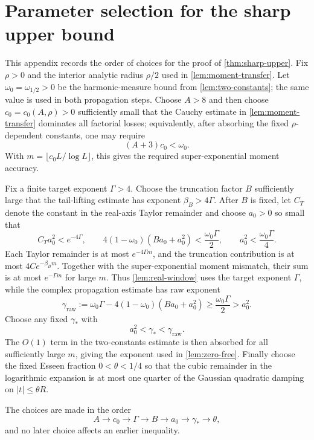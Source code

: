 \section{Parameter selection for the sharp upper bound}\label{app:parameters}

This appendix records the order of choices for the proof of \cref{thm:sharp-upper}. Fix $\rho>0$ and the interior analytic radius $\rho/2$ used in \cref{lem:moment-transfer}. Let $\omega_0=\omega_{1/2}>0$ be the harmonic-measure bound from \cref{lem:two-constants}; the same value is used in both propagation steps. Choose $A>8$ and then choose $c_0=c_0(A,\rho)>0$ sufficiently small that the Cauchy estimate in \cref{lem:moment-transfer} dominates all factorial losses; equivalently, after absorbing the fixed $\rho$-dependent constants, one may require
\[
(A+3)c_0<\omega_0.
\]
With $m=\lfloor c_0L/\log L\rfloor$, this gives the required super-exponential moment accuracy.

Fix a finite target exponent $\Gamma>4$. Choose the truncation factor $B$ sufficiently large that the tail-lifting estimate has exponent $\beta_B>4\Gamma$. After $B$ is fixed, let $C_T$ denote the constant in the real-axis Taylor remainder and choose $a_0>0$ so small that
\[
C_Ta_0^2<e^{-4\Gamma},\qquad
4(1-\omega_0)(Ba_0+a_0^2)<\frac{\omega_0\Gamma}{2},\qquad
a_0^2<\frac{\omega_0\Gamma}{4}.
\]
Each Taylor remainder is at most $e^{-4\Gamma m}$, and the truncation contribution is at most $4Ce^{-\beta_Bm}$. Together with the super-exponential moment mismatch, their sum is at most $e^{-\Gamma m}$ for large $m$. Thus \cref{lem:real-window} uses the target exponent $\Gamma$, while the complex propagation estimate has raw exponent
\[
\gamma_{\mathrm{raw}}
:=\omega_0\Gamma-4(1-\omega_0)(Ba_0+a_0^2)
\ge\frac{\omega_0\Gamma}{2}>a_0^2.
\]
Choose any fixed $\gamma_*$ with
\[
a_0^2<\gamma_*<\gamma_{\mathrm{raw}}.
\]
The $O(1)$ term in the two-constants estimate is then absorbed for all sufficiently large $m$, giving the exponent used in \cref{lem:zero-free}. Finally choose the fixed Esseen fraction $0<\theta<1/4$ so that the cubic remainder in the logarithmic expansion is at most one quarter of the Gaussian quadratic damping on $|t|\le\theta R$.

The choices are made in the order
\[
A\to c_0\to\Gamma\to B\to a_0\to\gamma_*\to\theta,
\]
and no later choice affects an earlier inequality.
